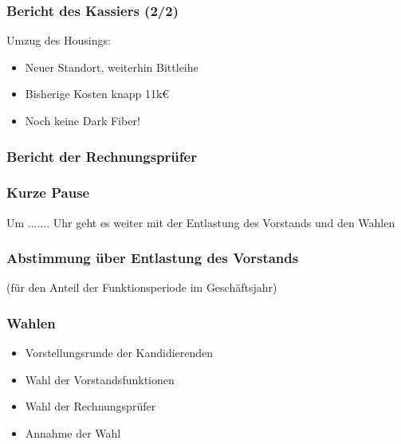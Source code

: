 \documentclass[17pt]{beamer} %
\begin{document}
\begin{frame}
	\frametitle{Bericht des Kassiers (2/2)}
	Umzug des Housings:
	\begin{itemize}
		\item Neuer Standort, weiterhin Bittleihe
		\item Bisherige Kosten knapp 11k€
		\item Noch keine Dark Fiber!
	\end{itemize}
\end{frame}



\begin{frame}
	\frametitle{Bericht der Rechnungsprüfer}
\end{frame}



\begin{frame}
	\frametitle{Kurze Pause}
	Um ....... Uhr geht es weiter mit der Entlastung des Vorstands und
	den Wahlen
\end{frame}



\begin{frame}
	\frametitle{Abstimmung über Entlastung des Vorstands}
	(für den Anteil der Funktionsperiode im Geschäftsjahr)
\end{frame}



\begin{frame}
	\frametitle{Wahlen}
	\begin{itemize}
		\item Vorstellungsrunde der Kandidierenden
		\item Wahl der Vorstandsfunktionen
		\item Wahl der Rechnungsprüfer
		\item Annahme der Wahl
	\end{itemize}
\end{frame}
\end{document}
